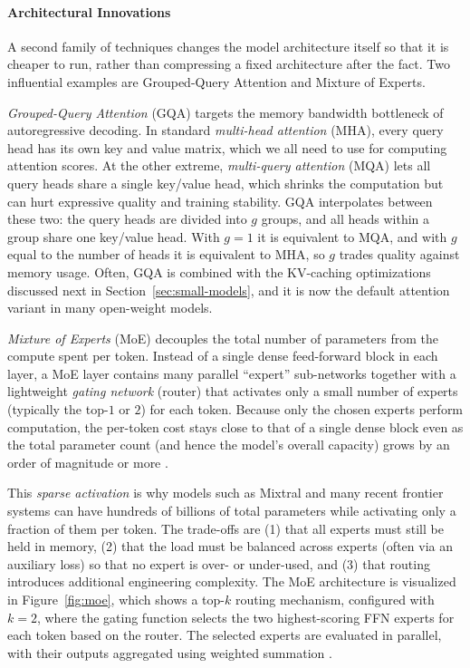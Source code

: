 \paragraph{Architectural Innovations}
A second family of techniques changes the model architecture itself so that it is cheaper to run, rather than compressing a fixed architecture after the fact. Two influential examples are Grouped-Query Attention and Mixture of Experts.

\textit{Grouped-Query Attention} (GQA) \citep{ainslie-etal-2023-gqa} targets the memory bandwidth bottleneck of autoregressive decoding. In standard \emph{multi-head attention} (MHA), every query head has its own key and value matrix, which we all need to use for computing attention scores. At the other extreme, \emph{multi-query attention} (MQA) lets all query heads share a single key/value head, which shrinks the computation  but can hurt expressive quality and training stability. GQA interpolates between these two: the query heads are divided into $g$ groups, and all heads within a group share one key/value head. With $g = 1$ it is equivalent to MQA, and with $g$ equal to the number of heads it is equivalent to MHA, so $g$ trades quality against memory usage. Often, GQA is combined with the KV-caching optimizations discussed next in Section~\ref{sec:small-models}, and it is now the default attention variant in many open-weight models.

\textit{Mixture of Experts} (MoE) \citep{shazeer2017outrageouslylargeneuralnetworks} decouples the total number of parameters from the compute spent per token. Instead of a single dense feed-forward block in each layer, a MoE layer contains many parallel ``expert'' sub-networks together with a lightweight \emph{gating network} (router) that activates only a small number of experts (typically the top-$1$ or $2$) for each token. Because only the chosen experts perform computation, the per-token cost stays close to that of a single dense block even as the total parameter count (and hence the model's overall capacity) grows by an order of magnitude or more \citep{JMLR:v23:21-0998}. 

This \emph{sparse activation} is why models such as Mixtral and many recent frontier systems can have hundreds of billions of total parameters while activating only a fraction of them per token. The trade-offs are (1) that all experts must still be held in memory, (2) that the load must be balanced across experts (often via an auxiliary loss) so that no expert is over- or under-used, and (3) that routing introduces additional engineering complexity. The MoE architecture is visualized in Figure~\ref{fig:moe}, which shows a top-$k$ routing mechanism, configured with $k=2$, where the gating function selects the two highest-scoring FFN experts for each token based on the router. The selected experts are evaluated in parallel, with their outputs aggregated using weighted summation \citep{zhang2025mixtureexpertslargelanguage}. 

